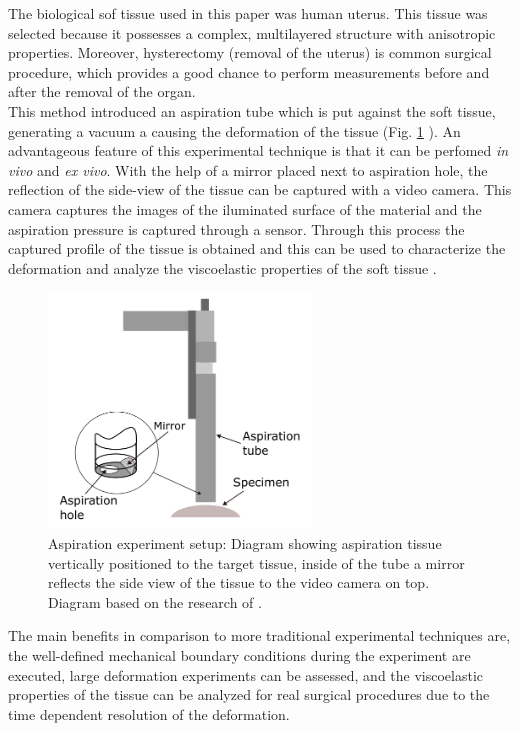 The biological sof tissue used in this paper was human uterus. This tissue was selected 
because it possesses a complex, multilayered structure with anisotropic properties. 
Moreover, hysterectomy (removal of the uterus) is common surgical procedure, which 
provides a good chance to perform measurements before and after the removal of the organ.\\

This method introduced an aspiration tube which is put against the 
soft tissue, generating a vacuum a causing the deformation of the tissue (Fig. \ref{fig:aspiration} ). 
An advantageous feature of this experimental technique is that 
it can be perfomed \textit{in vivo} and \textit{ex vivo}.
With the help of a mirror placed next to aspiration hole, the reflection 
of the side-view of the tissue can be captured with a video camera.
This camera captures the images of the iluminated surface of the material and the 
aspiration pressure is captured through a sensor. Through this process the captured 
profile of the tissue is obtained and this can be used to characterize the deformation 
and analyze the viscoelastic properties of the soft tissue \cite{Kauer2002}.

\begin{figure}[th]
        \centering
        \includegraphics[width=7cm]{Images/chapter1/aspirationkauer.png}
        \caption[Aspiration experiment]{Aspiration experiment setup: Diagram showing aspiration tissue vertically positioned to the target tissue, inside of the tube a mirror reflects the side view of the tissue to the video camera on top. Diagram based on the research of \citet{Kauer2002}.}
        \label{fig:aspiration}
\end{figure}

The main benefits in comparison to more traditional experimental techniques are, 
the well-defined mechanical boundary conditions during the experiment are executed, 
large deformation experiments can be assessed, and the viscoelastic
properties of the tissue can be analyzed for real surgical procedures due to 
the time dependent resolution of the deformation.


